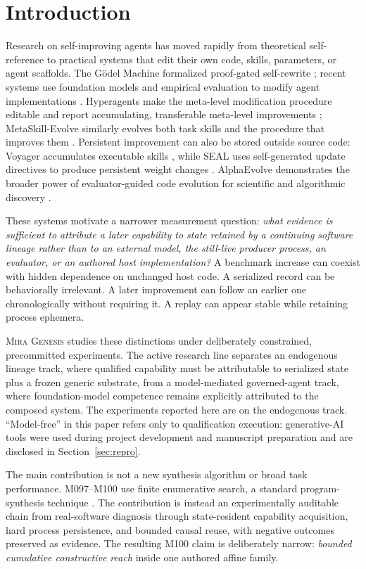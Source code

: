 \documentclass[10pt]{article}
\newcommand{\genesis}{\textsc{Mira Genesis}\xspace}
\begin{document}
\section{Introduction}
Research on self-improving agents has moved rapidly from theoretical self-reference to practical systems that edit their own code, skills, parameters, or agent scaffolds. The G{\"o}del Machine formalized proof-gated self-rewrite \cite{schmidhuber2007godel}; recent systems use foundation models and empirical evaluation to modify agent implementations \cite{yin2024godelagent,robeyns2025selfimproving,zhang2025dgm}. Hyperagents make the meta-level modification procedure editable and report accumulating, transferable meta-level improvements \cite{zhang2026hyperagents}; MetaSkill-Evolve similarly evolves both task skills and the procedure that improves them \cite{wang2026metaskill}. Persistent improvement can also be stored outside source code: Voyager accumulates executable skills \cite{wang2023voyager}, while SEAL uses self-generated update directives to produce persistent weight changes \cite{zweiger2025seal}. AlphaEvolve demonstrates the broader power of evaluator-guided code evolution for scientific and algorithmic discovery \cite{novikov2025alphaevolve}.

These systems motivate a narrower measurement question: \emph{what evidence is sufficient to attribute a later capability to state retained by a continuing software lineage rather than to an external model, the still-live producer process, an evaluator, or an authored host implementation?} A benchmark increase can coexist with hidden dependence on unchanged host code. A serialized record can be behaviorally irrelevant. A later improvement can follow an earlier one chronologically without requiring it. A replay can appear stable while retaining process ephemera.

\genesis studies these distinctions under deliberately constrained, precommitted experiments. The active research line separates an endogenous lineage track, where qualified capability must be attributable to serialized state plus a frozen generic substrate, from a model-mediated governed-agent track, where foundation-model competence remains explicitly attributed to the composed system. The experiments reported here are on the endogenous track. ``Model-free'' in this paper refers only to qualification execution: generative-AI tools were used during project development and manuscript preparation and are disclosed in Section~\ref{sec:repro}.

The main contribution is not a new synthesis algorithm or broad task performance. M097--M100 use finite enumerative search, a standard program-synthesis technique \cite{gulwani2017synthesis}. The contribution is instead an experimentally auditable chain from real-software diagnosis through state-resident capability acquisition, hard process persistence, and bounded causal reuse, with negative outcomes preserved as evidence. The resulting M100 claim is deliberately narrow: \emph{bounded cumulative constructive reach} inside one authored affine family.
\end{document}
